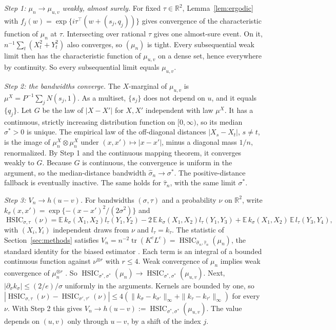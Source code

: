 \documentclass[11pt]{article}
\theoremstyle{remark}
\newcommand{\HSIC}{\operatorname{HSIC}}
\newcommand{\E}{\mathbb E}
\begin{document}
\emph{Step 1: $\mu_n\to\mu_{u,v}$ weakly, almost surely.} For fixed $\tau\in\mathbb R^2$, Lemma~\ref{lem:ergodic} with $f_j(w)=\exp\{i\tau^\top(w+(s_j,q_j))\}$ gives convergence of the characteristic function of $\mu_n$ at $\tau$. Intersecting over rational $\tau$ gives one almost-sure event. On it, $n^{-1}\sum_t(X_t^2+Y_t^2)$ also converges, so $(\mu_n)$ is tight. Every subsequential weak limit then has the characteristic function of $\mu_{u,v}$ on a dense set, hence everywhere by continuity. So every subsequential limit equals $\mu_{u,v}$.

\emph{Step 2: the bandwidths converge.} The $X$-marginal of $\mu_{u,v}$ is $\mu^X=P^{-1}\sum_jN(s_j,1)$. As a multiset, $\{s_j\}$ does not depend on $u$, and it equals $\{q_j\}$. Let $G$ be the law of $|X-X'|$ for $X,X'$ independent with law $\mu^X$. It has a continuous, strictly increasing distribution function on $[0,\infty)$, so its median $\sigma^*>0$ is unique. The empirical law of the off-diagonal distances $|X_s-X_t|$, $s\ne t$, is the image of $\mu_n^X\otimes\mu_n^X$ under $(x,x')\mapsto|x-x'|$, minus a diagonal mass $1/n$, renormalized. By Step 1 and the continuous mapping theorem, it converges weakly to $G$. Because $G$ is continuous, the convergence is uniform in the argument, so the median-distance bandwidth $\hat\sigma_n\to\sigma^*$. The positive-distance fallback is eventually inactive. The same holds for $\hat\tau_n$, with the same limit $\sigma^*$.

\emph{Step 3: $V_n\to h(u-v)$.} For bandwidths $(\sigma,\tau)$ and a probability $\nu$ on $\mathbb R^2$, write $k_\sigma(x,x')=\exp\{-(x-x')^2/(2\sigma^2)\}$ and
\[
\HSIC_{\sigma,\tau}(\nu)=\E\,k_\sigma(X_1,X_2)l_\tau(Y_1,Y_2)-2\,\E\,k_\sigma(X_1,X_2)l_\tau(Y_1,Y_3)+\E\,k_\sigma(X_1,X_2)\,\E\,l_\tau(Y_3,Y_4),
\]
with $(X_i,Y_i)$ independent draws from $\nu$ and $l_\tau=k_\tau$. The statistic of Section~\ref{sec:methods} satisfies $V_n=n^{-2}\operatorname{tr}(K^cL^c)=\HSIC_{\hat\sigma_n,\hat\tau_n}(\mu_n)$, the standard identity for the biased estimator \citep{gretton2005measuring}. Each term is an integral of a bounded continuous function against $\nu^{\otimes r}$ with $r\le4$. Weak convergence of $\mu_n$ implies weak convergence of $\mu_n^{\otimes r}$ \citep[Theorem~2.8]{billingsley1999convergence}. So $\HSIC_{\sigma^*,\sigma^*}(\mu_n)\to\HSIC_{\sigma^*,\sigma^*}(\mu_{u,v})$. Next, $|\partial_\sigma k_\sigma|\le(2/e)/\sigma$ uniformly in the arguments. Kernels are bounded by one, so $|\HSIC_{\sigma,\tau}(\nu)-\HSIC_{\sigma',\tau'}(\nu)|\le4(\|k_\sigma-k_{\sigma'}\|_\infty+\|k_\tau-k_{\tau'}\|_\infty)$ for every $\nu$. With Step 2 this gives $V_n\to h(u-v):=\HSIC_{\sigma^*,\sigma^*}(\mu_{u,v})$. The value depends on $(u,v)$ only through $u-v$, by a shift of the index $j$.
\end{document}
